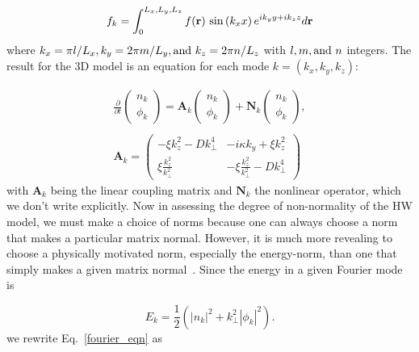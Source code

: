 \documentclass[twocolumn,showkeys,superscriptaddress]{revtex4}
\def\beq{\begin{equation}}
\def\eeq{\end{equation}}
\def\beqar{\begin{eqnarray}}
\def\eeqar{\end{eqnarray}}
\begin{document}
\beq
\label{fourier_form}
f_k = \int_0^{L_x,L_y,L_z} f(\mathbf{r}) \ {\rm sin} \left( k_x x \right) e^{i k_y y + i k_z z} d\mathbf{r}
\eeq
where $k_x = \pi l/L_x, k_y = 2 \pi m/L_y, {\rm and } \ k_z = 2 \pi n/L_z$ with $l, m, {\rm and } \ n$ integers.
The result for the 3D model is an equation for each mode $k = (k_x,k_y,k_z)$:

\beqar
\label{fourier_eqn}
\frac{\partial}{\partial t} \left( \begin{array}{cc} n_k \\ \phi_k \end{array} \right) = \mathbf{A}_k \left( \begin{array}{cc} n_k \\ \phi_k \end{array} \right) + \mathbf{N}_k \left( \begin{array}{cc} n_k \\ \phi_k \end{array} \right), \\ \nonumber \\
\label{A_k}
\mathbf{A}_k = \left( \begin{array}{cc} -\xi k_z^2 - D k_\perp^4 & -i \kappa k_y + \xi k_z^2 \\  \xi \frac{k_z^2}{k_\perp^2} & - \xi \frac{k_z^2}{k_\perp^2} - D k_\perp^4\end{array} \right)
\eeqar
with $\mathbf{A}_k$ being the linear coupling matrix and $\mathbf{N}_k$ the nonlinear operator, which we don't write explicitly.
Now in assessing the degree of non-normality of the HW model, we must make a choice of norms because one can always choose a norm that makes a particular matrix normal. However, it is much more revealing to choose
a physically motivated norm, especially the energy-norm, than one that simply makes a given matrix normal~\cite{camargo1998,schmid2007,camporeale2010}. Since the energy in a given Fourier mode is

\beq
\label{en_def}
E_k =  \frac{1}{2} \left( |n_k|^2 + k_\perp^2 |\phi_k|^2 \right).
\eeq
we rewrite Eq.~\ref{fourier_eqn} as
\end{document}
